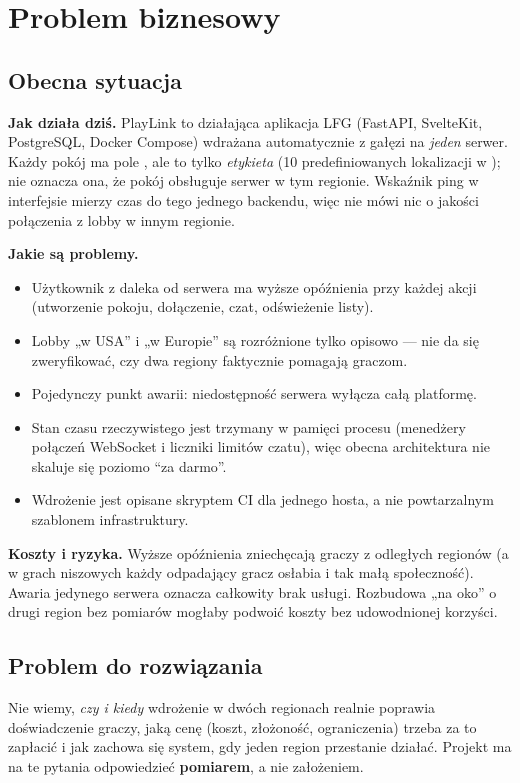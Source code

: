\documentclass[12pt,a4paper]{article}
\newcommand{\code}[1]{\texttt{\detokenize{#1}}}
\begin{document}
\newpage
\section{Problem biznesowy}

\subsection{Obecna sytuacja}
\textbf{Jak działa dziś.} PlayLink to działająca aplikacja LFG (FastAPI, SvelteKit,
PostgreSQL, Docker Compose) wdrażana automatycznie z gałęzi \code{main} na
\emph{jeden} serwer. Każdy pokój ma pole \code{lobby_location}, ale to tylko
\emph{etykieta} (10 predefiniowanych lokalizacji w \code{backend/config.py}); nie
oznacza ona, że pokój obsługuje serwer w tym regionie. Wskaźnik ping w interfejsie
mierzy czas do tego jednego backendu, więc nie mówi nic o jakości połączenia z
lobby w innym regionie.

\textbf{Jakie są problemy.}
\begin{itemize}
  \item Użytkownik z daleka od serwera ma wyższe opóźnienia przy każdej akcji
        (utworzenie pokoju, dołączenie, czat, odświeżenie listy).
  \item Lobby „w USA'' i „w Europie'' są rozróżnione tylko opisowo --- nie da się
        zweryfikować, czy dwa regiony faktycznie pomagają graczom.
  \item Pojedynczy punkt awarii: niedostępność serwera wyłącza całą platformę.
  \item Stan czasu rzeczywistego jest trzymany w pamięci procesu
        (menedżery połączeń WebSocket i liczniki limitów
        czatu), więc obecna architektura nie skaluje się poziomo ``za darmo''.
  \item Wdrożenie jest opisane skryptem CI dla jednego hosta, a nie powtarzalnym
        szablonem infrastruktury.
\end{itemize}

\textbf{Koszty i ryzyka.} Wyższe opóźnienia zniechęcają graczy z odległych
regionów (a w grach niszowych każdy odpadający gracz osłabia i tak małą
społeczność). Awaria jedynego serwera oznacza całkowity brak usługi. Rozbudowa „na
oko'' o drugi region bez pomiarów mogłaby podwoić koszty bez udowodnionej korzyści.

\subsection{Problem do rozwiązania}
Nie wiemy, \emph{czy i kiedy} wdrożenie w dwóch regionach realnie poprawia
doświadczenie graczy, jaką cenę (koszt, złożoność, ograniczenia) trzeba za to
zapłacić i jak zachowa się system, gdy jeden region przestanie działać. Projekt ma
na te pytania odpowiedzieć \textbf{pomiarem}, a nie założeniem.
\end{document}
